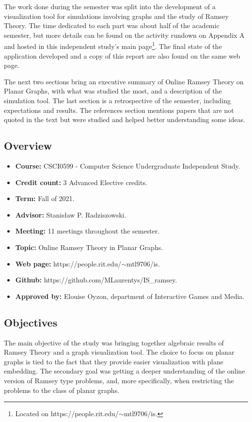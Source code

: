 The work done during the semester was split into the development of a visualization tool for simulations involving graphs and the study of Ramsey Theory. The time dedicated to each part was about half of the academic semester, but more details can be found on the activity rundown on Appendix A and hosted in this independent study's main page\footnote{Located on https://people.rit.edu/$\sim$mtl9706/is.}. The final state of the application developed and a copy of this report are also found on the same web page.

The next two sections bring an executive summary of Online Ramsey Theory on Planar Graphs, with what was studied the most, and a description of the simulation tool. The last section is a retrospective of the semester, including expectations and results. The references section mentions papers that are not quoted in the text but were studied and helped better understanding some ideas.

\subsection*{Overview}

\begin{itemize}
	\item \textbf{Course:} CSCI0599 - Computer Science Undergraduate Independent Study.
	\item \textbf{Credit count:} 3 Advanced Elective credits.
	\item \textbf{Term:} Fall of 2021.
	\item \textbf{Advisor:} Stanis\l{}aw P. Radziszowski.
	\item \textbf{Meeting:} 11 meetings throughout the semester.
	\item \textbf{Topic:} Online Ramsey Theory in Planar Graphs.
	\item \textbf{Web page:} https://people.rit.edu/$\sim$mtl9706/is.
	\item \textbf{Github:} https://github.com/MLaurentys/IS\_ramsey.
	\item \textbf{Approved by:} Elouise Oyzon, department of Interactive Games and Media.
\end{itemize}

\subsection*{Objectives}

The main objective of the study was bringing together algebraic results of Ramsey Theory and a graph visualization tool. The choice to focus on planar graphs is tied to the fact that they provide easier visualization with plane embedding. The secondary goal was getting a deeper understanding of the online version of Ramsey type problems, and, more specifically, when restricting the problems to the class of planar graphs.
